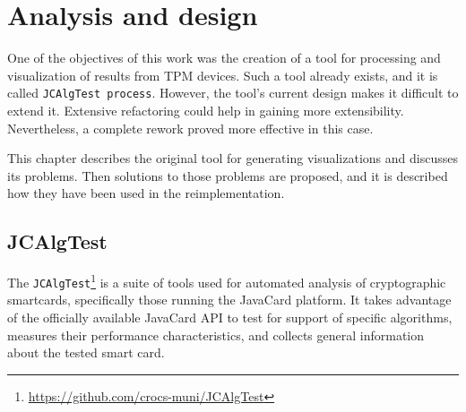 \chapter{Analysis and design}
One of the objectives of this work was the creation of a tool for processing and visualization of results from TPM devices. Such a tool already exists, and it is called \texttt{JCAlgTest process}. However, the tool's current design makes it difficult to extend it. Extensive refactoring could help in gaining more extensibility. Nevertheless, a complete rework proved more effective in this case.

This chapter describes the original tool for generating visualizations and discusses its problems. Then solutions to those problems are proposed, and it is described how they have been used in the reimplementation.

\section{JCAlgTest}\label{sec:jcalgtest}
The \texttt{JCAlgTest}\footnote{\url{https://github.com/crocs-muni/JCAlgTest}} is a suite of tools used for automated analysis of cryptographic smartcards, specifically those running the JavaCard platform. It takes advantage of the officially available JavaCard API to test for support of specific algorithms, measures their performance characteristics, and collects general information about the tested smart card.

